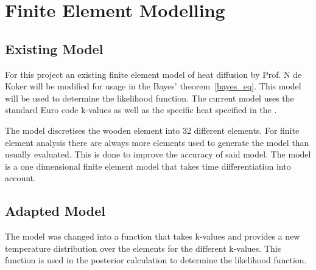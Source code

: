 \chapter{Finite Element Modelling}
\section{Existing Model}
	For this project an existing finite element model of heat diffusion by Prof. N de Koker will be modified for usage in the Bayes' theorem~\ref{bayes_eq}. 
	This model will be used to determine the likelihood function. 
	The current model uses the standard Euro code k-values as well as the specific heat specified in the \citep{Euro:2004}. 
	
	The model discretises the wooden element into 32 different elements. For finite element analysis there are always more elements used to generate the model than usually evaluated. This is done to improve the accuracy of said model.
	The model is a one dimensional finite element model that takes time differentiation into account. 
	
	
\section{Adapted Model}	
	The model was changed into a function that takes k-values and provides a new temperature distribution over the elements for the different k-values. 
	This function is used in the posterior calculation to determine the likelihood function.
	
	